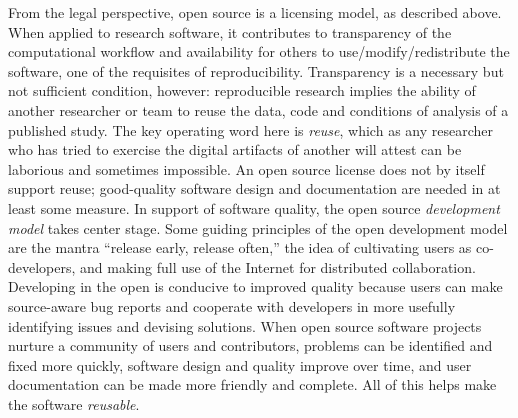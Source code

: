 \documentclass{statement}
\newlength{\up}
\begin{document}
From the legal perspective, open source is a licensing model, as described above. 
When applied to research software, it contributes to transparency of the computational workflow and availability for others to use/modify/redistribute the software, one of the requisites of reproducibility. 
Transparency is a necessary but not sufficient condition, however: reproducible research implies the ability of another researcher or team to reuse the data, code and conditions of analysis of a published study. 
The key operating word here is \emph{reuse}, which as any researcher who has tried to exercise the digital artifacts of another will attest can be laborious and sometimes impossible. 
An open source license does not by itself support reuse; good-quality software design and documentation are needed in at least some measure. 
In support of software quality, the open source \emph{development model }takes center stage. 
Some guiding principles of the open development model are the mantra ``release early, release often,'' the idea of cultivating users as co-developers, and making full use of the Internet for distributed collaboration. 
Developing in the open is conducive to improved quality because users can make source-aware bug reports and cooperate with developers in more usefully identifying issues and devising solutions. 
When open source software projects nurture a community of users and contributors, problems can be identified and fixed more quickly, software design and quality improve over time, and user documentation can be made more friendly and complete. 
All of this helps make the software \emph{reusable}.
\end{document}
